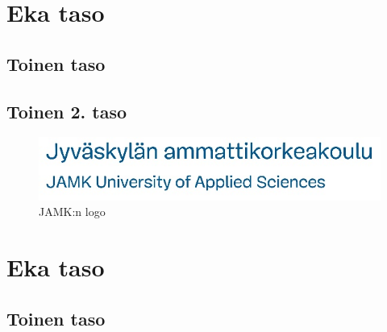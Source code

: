 \documentclass{jamk}
\begin{document}
\makejamktitle

\section{Eka taso}
\lipsum[1]
\lipsum[2]

\subsection{Toinen taso}
\lipsum[1]
\lipsum[2]
\lipsum[3]
\lipsum[4]

\subsection{Toinen 2. taso}
\lipsum[1]
\begin{figure}
  \includegraphics{jamkfi_long.png}
  \caption{JAMK:n logo}
  \label{}
\end{figure}
\lipsum[2]
\lipsum[3]

\section{Eka taso}
\lipsum[1]

\subsection{Toinen taso}
\lipsum[1]
\lipsum[2]
\lipsum[3]
\end{document}
